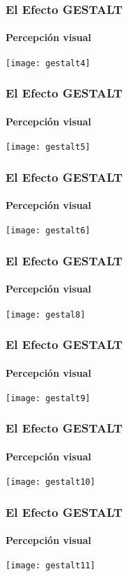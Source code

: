 \documentclass[14pt]{beamer}
\begin{document}
\begin{frame}
\frametitle{El Efecto GESTALT}
\framesubtitle{Percepción visual}
\begin{center}
\texttt{[image: gestalt4]}
\end{center}
\end{frame}
\begin{frame}
\frametitle{El Efecto GESTALT}
\framesubtitle{Percepción visual}
\begin{center}
\texttt{[image: gestalt5]}
\end{center}
\end{frame}
\begin{frame}
\frametitle{El Efecto GESTALT}
\framesubtitle{Percepción visual}
\begin{center}
\texttt{[image: gestalt6]}
\end{center}
\end{frame}
\begin{frame}
\frametitle{El Efecto GESTALT}
\framesubtitle{Percepción visual}
\begin{center}
\texttt{[image: gestal8]}
\end{center}
\end{frame}
\begin{frame}
\frametitle{El Efecto GESTALT}
\framesubtitle{Percepción visual}
\begin{center}
\texttt{[image: gestalt9]}
\end{center}
\end{frame}
\begin{frame}
\frametitle{El Efecto GESTALT}
\framesubtitle{Percepción visual}
\begin{center}
\texttt{[image: gestalt10]}
\end{center}
\end{frame}
\begin{frame}
\frametitle{El Efecto GESTALT}
\framesubtitle{Percepción visual}
\begin{center}
\texttt{[image: gestalt11]}
\end{center}
\end{frame}
\end{document}
